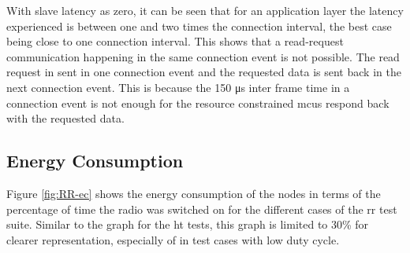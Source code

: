 With slave latency as zero, it can be seen that for an application layer the latency experienced is between one and two times the connection interval, the best case being close to one connection interval. This shows that a read-request communication happening in the same connection event is not possible. The read request in sent in one connection event and the requested data is sent back in the next connection event. This is because the 150 \si{\micro \second} inter frame time in a connection event is not enough for the resource constrained \glspl{mcu} respond back with the requested data.
%
%

\subsection{Energy Consumption}
Figure \ref{fig:RR-ec} shows the energy consumption of the nodes in terms of the percentage of time the radio was switched on for the different cases of the \gls{rr} test suite. Similar to the graph for the \gls{ht} tests, this graph is limited to 30\% for clearer representation, especially of in test cases with low duty cycle.

